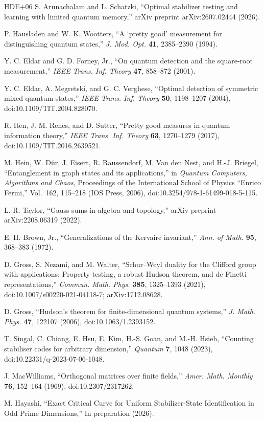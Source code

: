 \documentclass[11pt]{article}
\newcommand{\1}{\mathbf 1}
\theoremstyle{plain}
\theoremstyle{definition}
\theoremstyle{remark}
\begin{document}
\begin{thebibliography}{HDE+06}
S. Arunachalam and L. Schatzki, ``Optimal stabilizer testing and learning
with limited quantum memory,'' arXiv preprint arXiv:2607.02444 (2026).


P. Hausladen and W. K. Wootters,
``A `pretty good' measurement for distinguishing quantum states,''
\emph{J. Mod. Opt.} \textbf{41}, 2385--2390 (1994).

Y. C. Eldar and G. D. Forney, Jr.,
``On quantum detection and the square-root measurement,''
\emph{IEEE Trans. Inf. Theory} \textbf{47}, 858--872 (2001).

Y. C. Eldar, A. Megretski, and G. C. Verghese,
``Optimal detection of symmetric mixed quantum states,''
\emph{IEEE Trans. Inf. Theory} \textbf{50}, 1198--1207 (2004),
doi:10.1109/TIT.2004.828070.

R. Iten, J. M. Renes, and D. Sutter,
``Pretty good measures in quantum information theory,''
\emph{IEEE Trans. Inf. Theory} \textbf{63}, 1270--1279 (2017),
doi:10.1109/TIT.2016.2639521.

M. Hein, W. D{\"u}r, J. Eisert, R. Raussendorf, M. Van den Nest, and
H.-J. Briegel,
``Entanglement in graph states and its applications,''
in \emph{Quantum Computers, Algorithms and Chaos}, Proceedings of the
International School of Physics ``Enrico Fermi,'' Vol.~162, 115--218
(IOS Press, 2006), doi:10.3254/978-1-61499-018-5-115.

L. R. Taylor, ``Gauss sums in algebra and topology,''
arXiv preprint arXiv:2208.06319 (2022).

E. H. Brown, Jr., ``Generalizations of the Kervaire invariant,''
\emph{Ann. of Math.} \textbf{95}, 368--383 (1972).

D. Gross, S. Nezami, and M. Walter,
``Schur--Weyl duality for the Clifford group with applications: Property
testing, a robust Hudson theorem, and de Finetti representations,''
\emph{Commun. Math. Phys.} \textbf{385}, 1325--1393 (2021),
doi:10.1007/s00220-021-04118-7; arXiv:1712.08628.

D. Gross, ``Hudson's theorem for finite-dimensional quantum systems,''
\emph{J. Math. Phys.} \textbf{47}, 122107 (2006),
doi:10.1063/1.2393152.

T. Singal, C. Chiang, E. Hsu, E. Kim, H.-S. Goan, and M.-H. Hsieh,
``Counting stabiliser codes for arbitrary dimension,''
\emph{Quantum} \textbf{7}, 1048 (2023),
doi:10.22331/q-2023-07-06-1048.

J. MacWilliams, ``Orthogonal matrices over finite fields,''
\emph{Amer. Math. Monthly} \textbf{76}, 152--164 (1969),
doi:10.2307/2317262.

M. Hayashi,
``Exact Critical Curve for Uniform Stabilizer-State Identification in Odd Prime Dimensions,''
In preparation (2026).

\end{thebibliography}
\end{document}
